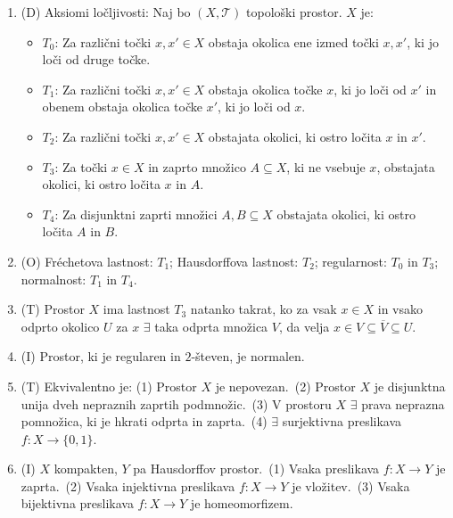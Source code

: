 \documentclass[10pt,a4paper]{article}
\newcommand{\TT}{\mathcal{T}}
\begin{document}
\begin{enumerate}
\item (D) Aksiomi ločljivosti: Naj bo $(X,\TT)$ topološki prostor. $X$ je: 
            \begin{itemize}
                \setlength\itemsep{-4px}
                \item $T_0$: Za različni točki $x,x'\in X$ obstaja okolica ene izmed točki $x,x'$, ki jo loči od druge točke.
                \item $T_1$: Za različni točki $x,x'\in X$ obstaja okolica točke $x$, ki jo loči od $x'$ in obenem obstaja okolica točke $x'$, ki jo loči od $x$.
                \item $T_2$: Za različni točki $x,x'\in X$ obstajata okolici, ki ostro ločita $x$ in $x'$.
                \item $T_3$: Za točki $x\in X$ in zaprto množico $A\subseteq X$, ki ne vsebuje $x$, obstajata okolici, ki ostro ločita $x$ in $A$.
                \item $T_4$: Za disjunktni zaprti množici $A,B\subseteq X$ obstajata okolici, ki ostro ločita $A$ in $B$.
            \end{itemize}
            
\item (O) Fréchetova lastnost: $T_1$; Hausdorffova lastnost: $T_2$; regularnost: $T_0$ in $T_3$; normalnost: $T_1$ in $T_4$.
            
\item (T) Prostor $X$ ima lastnost $T_3$ natanko takrat, ko za vsak $x\in X$ in vsako odprto okolico $U$ za $x$ $\exists$ taka odprta množica $V$, da velja $x\in V\subseteq \overline{V}\subseteq U$.
            
\item (I) Prostor, ki je regularen in $2$-števen, je normalen.
            
\item (T) Ekvivalentno je: (1) Prostor $X$ je nepovezan.~(2) Prostor $X$ je disjunktna unija dveh nepraznih zaprtih podmnožic.~(3) V prostoru $X$ $\exists$ prava neprazna pomnožica, ki je hkrati odprta in zaprta.~(4) $\exists$ surjektivna preslikava $f:X\to\{0,1\}$.
            
\item (I)  $X$ kompakten, $Y$ pa Hausdorffov prostor.~(1) Vsaka preslikava $f:X\to Y$ je zaprta.~(2) Vsaka injektivna preslikava $f:X\to Y$ je vložitev.~(3) Vsaka bijektivna preslikava $f:X\to Y$ je homeomorfizem.
            

\end{enumerate}
\end{document}
